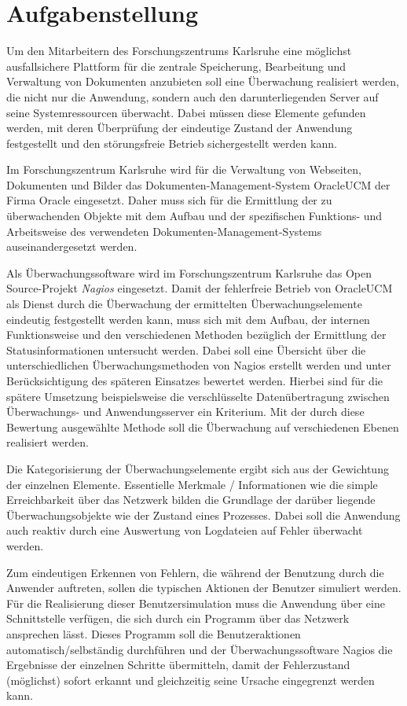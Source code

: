 \section{Aufgabenstellung}

Um den Mitarbeitern des Forschungszentrums Karlsruhe eine möglichst ausfallsichere Plattform für die zentrale Speicherung, Bearbeitung und Verwaltung von Dokumenten anzubieten soll eine Überwachung realisiert werden, die nicht nur die Anwendung, sondern auch den darunterliegenden Server auf seine Systemressourcen überwacht.
Dabei müssen diese Elemente gefunden werden, mit deren Überprüfung der eindeutige Zustand der Anwendung festgestellt und den störungsfreie Betrieb sichergestellt werden kann.

Im Forschungszentrum Karlsruhe wird für die Verwaltung von Webseiten, Dokumenten und Bilder das Dokumenten-Management-System \gls{OracleUCM} der Firma Oracle  eingesetzt.
Daher muss sich für die Ermittlung der zu überwachenden Objekte mit dem Aufbau und der spezifischen Funktions- und Arbeitsweise des verwendeten Dokumenten-Management-Systems auseinandergesetzt werden.

Als Überwachungssoftware wird im Forschungszentrum Karlsruhe das Open Source-Projekt \textit{Nagios} eingesetzt.
Damit der fehlerfreie Betrieb von \gls{OracleUCM} als Dienst durch die Überwachung der ermittelten Überwachungselemente eindeutig festgestellt werden kann, muss sich mit dem Aufbau, der internen Funktionsweise und den verschiedenen Methoden bezüglich der Ermittlung der Statusinformationen untersucht werden.
Dabei soll eine Übersicht über die unterschiedlichen Überwachungsmethoden von Nagios erstellt werden und unter Berücksichtigung des späteren Einsatzes bewertet werden.
Hierbei sind für die spätere Umsetzung beispielsweise die verschlüsselte Datenübertragung zwischen Überwachungs- und Anwendungsserver ein Kriterium.
Mit der durch diese Bewertung ausgewählte Methode soll die Überwachung auf verschiedenen Ebenen realisiert werden.

Die Kategorisierung der Überwachungselemente ergibt sich aus der Gewichtung der einzelnen Elemente.
Essentielle Merkmale / Informationen wie die simple Erreichbarkeit über das Netzwerk bilden die Grundlage der darüber liegende Überwachungsobjekte wie der Zustand eines Prozesses.
Dabei soll die Anwendung auch reaktiv durch eine Auswertung von Logdateien auf Fehler überwacht werden.


Zum eindeutigen Erkennen von Fehlern, die während der Benutzung durch die Anwender auftreten, sollen die typischen Aktionen der Benutzer simuliert werden. 
Für die Realisierung dieser Benutzersimulation muss die Anwendung über eine Schnittstelle verfügen, die sich durch ein Programm über das Netzwerk ansprechen lässt.
Dieses Programm soll die Benutzeraktionen automatisch/selbständig durchführen und der Überwachungssoftware Nagios die Ergebnisse der einzelnen Schritte übermitteln, damit der Fehlerzustand (möglichst) sofort erkannt und gleichzeitig seine Ursache eingegrenzt werden kann.


